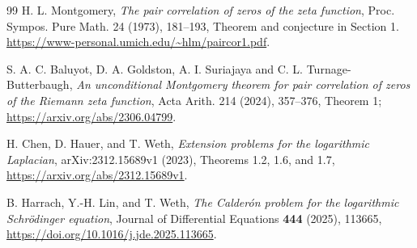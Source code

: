 \documentclass[11pt]{article}
\theoremstyle{remark}
\begin{document}
\begin{thebibliography}{99}
H. L. Montgomery, \emph{The pair correlation of zeros of the zeta
function}, Proc. Sympos. Pure Math. 24 (1973), 181--193,
Theorem and conjecture in Section 1.
\url{https://www-personal.umich.edu/~hlm/paircor1.pdf}.

S. A. C. Baluyot, D. A. Goldston, A. I. Suriajaya and
C. L. Turnage-Butterbaugh,
\emph{An unconditional Montgomery theorem for pair correlation of
zeros of the Riemann zeta function}, Acta Arith. 214 (2024), 357--376,
Theorem 1; \url{https://arxiv.org/abs/2306.04799}.

H. Chen, D. Hauer, and T. Weth,
\emph{Extension problems for the logarithmic Laplacian},
arXiv:2312.15689v1 (2023), Theorems 1.2, 1.6, and 1.7,
\url{https://arxiv.org/abs/2312.15689v1}.

B. Harrach, Y.-H. Lin, and T. Weth,
\emph{The Calder\'on problem for the logarithmic Schr\"odinger equation},
Journal of Differential Equations \textbf{444} (2025), 113665,
\url{https://doi.org/10.1016/j.jde.2025.113665}.

\end{thebibliography}
\end{document}
